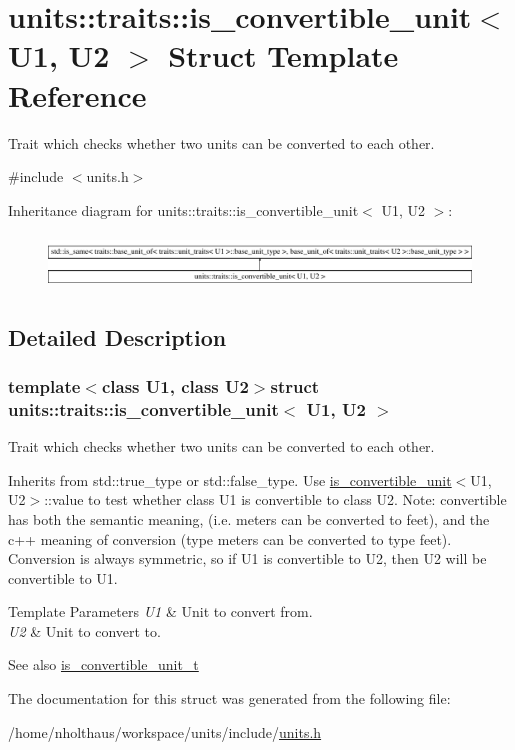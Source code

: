 \hypertarget{structunits_1_1traits_1_1is__convertible__unit}{}\section{units\+:\+:traits\+:\+:is\+\_\+convertible\+\_\+unit$<$ U1, U2 $>$ Struct Template Reference}
\label{structunits_1_1traits_1_1is__convertible__unit}


Trait which checks whether two units can be converted to each other.  




{\ttfamily \#include $<$units.\+h$>$}

Inheritance diagram for units\+:\+:traits\+:\+:is\+\_\+convertible\+\_\+unit$<$ U1, U2 $>$\+:\begin{figure}[H]
\begin{center}
\leavevmode
\includegraphics[height=1.437741cm]{structunits_1_1traits_1_1is__convertible__unit}
\end{center}
\end{figure}


\subsection{Detailed Description}
\subsubsection*{template$<$class U1, class U2$>$struct units\+::traits\+::is\+\_\+convertible\+\_\+unit$<$ U1, U2 $>$}

Trait which checks whether two units can be converted to each other. 

Inherits from {\ttfamily std\+::true\+\_\+type} or {\ttfamily std\+::false\+\_\+type}. Use {\ttfamily \hyperlink{structunits_1_1traits_1_1is__convertible__unit}{is\+\_\+convertible\+\_\+unit}$<$U1, U2$>$\+::value} to test whether {\ttfamily class U1} is convertible to {\ttfamily class U2}. Note\+: convertible has both the semantic meaning, (i.\+e. meters can be converted to feet), and the c++ meaning of conversion (type meters can be converted to type feet). Conversion is always symmetric, so if U1 is convertible to U2, then U2 will be convertible to U1. 
\begin{DoxyTemplParams}{Template Parameters}
{\em U1} & Unit to convert from. \\
\hline
{\em U2} & Unit to convert to. \\
\hline
\end{DoxyTemplParams}
\begin{DoxySeeAlso}{See also}
\hyperlink{structunits_1_1traits_1_1is__convertible__unit__t}{is\+\_\+convertible\+\_\+unit\+\_\+t} 
\end{DoxySeeAlso}


The documentation for this struct was generated from the following file\+:\begin{DoxyCompactItemize}
\item 
/home/nholthaus/workspace/units/include/\hyperlink{units_8h}{units.\+h}\end{DoxyCompactItemize}
